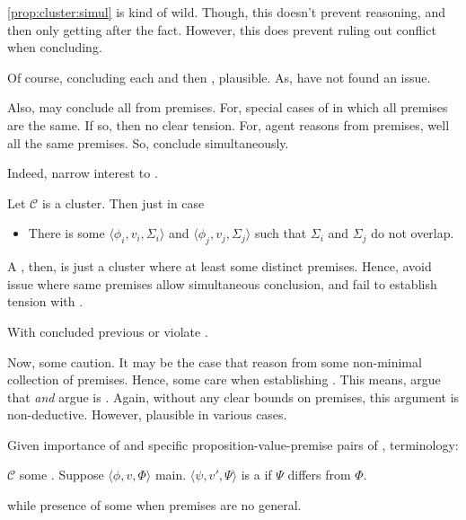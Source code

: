 \begin{note}
  \autoref{prop:cluster:simul} is kind of wild.
  Though, this doesn't prevent reasoning, and then only getting \csN{} after the fact.
  However, this does prevent ruling out conflict when concluding.

  Of course, concluding each and then \csVImp{}, plausible.
  As, have not found an issue.

  Also, may conclude all from premises.
  For, special cases of \cluster{} in which all premises are the same.
  If so, then no clear tension.
  For, agent reasons from premises, well all the same premises.
  So, conclude simultaneously.
\end{note}

\begin{note}
  Indeed, narrow interest to .

  \begin{definition}[\ragCluster{3}]
    Let \(\mathcal{C}\) is a cluster.
    Then \emph{\ragCluster{}} just in case
    \begin{itemize}
    \item
      There is some \(\langle \phi_{i},v_{i},\Sigma_{i} \rangle\) and \(\langle \phi_{j},v_{j},\Sigma_{j} \rangle\) such that \(\Sigma_{i}\) and \(\Sigma_{j}\) do not overlap.
    \end{itemize}
  \end{definition}

  A \ragCluster{}, then, is just a cluster where at least some distinct premises.
  Hence, avoid issue where same premises allow simultaneous conclusion, and fail to establish tension with \ESU{}.

  \begin{proposition}
    With \ragCluster{} concluded previous or violate \ESU{}.
  \end{proposition}

  Now, some caution.
  It may be the case that reason from some non-minimal collection of premises.
  Hence, some care when establishing \ragged{}.
  This means, argue that \cluster{} \emph{and} argue \cluster{} is \ragged{}.
  Again, without any clear bounds on premises, this argument is non-deductive.
  However, plausible in various cases.
\end{note}

\begin{note}[\jag{2}]
  Given importance of \ragged{} and specific proposition-value-premise pairs of \ragged{}, terminology:

  \begin{definition}
    \(\mathcal{C}\) some \ragCluster{}.
    Suppose \(\langle \phi,v,\Phi \rangle\) main.
    \(\langle \psi,v',\Psi \rangle\) is a \emph{} if \(\Psi\) differs from \(\Phi\).
  \end{definition}

  \csN{} while presence of some \jag{} when premises are no general.
\end{note}

